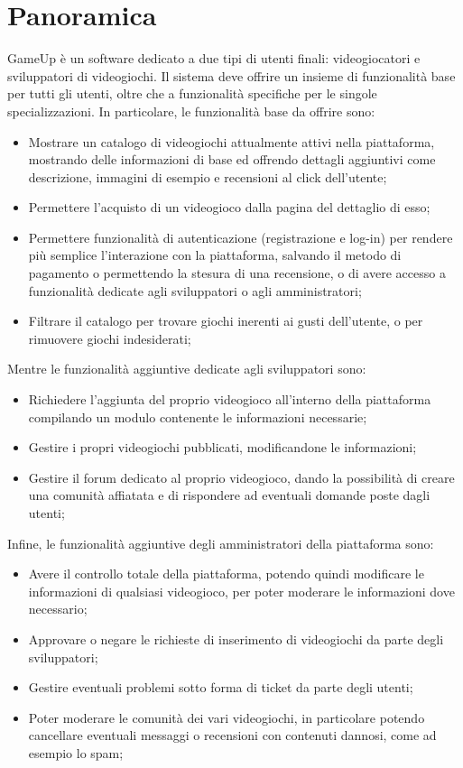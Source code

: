 \setcounter{secnumdepth}{3}
\section{Panoramica}
GameUp è un software dedicato a due tipi di utenti finali: videogiocatori e sviluppatori di videogiochi. Il sistema deve offrire un insieme di funzionalità base per tutti gli utenti, oltre che a funzionalità specifiche per le singole specializzazioni.
In particolare, le funzionalità base da offrire sono:
\begin{itemize}
\item Mostrare un catalogo di videogiochi attualmente attivi nella piattaforma, mostrando delle informazioni di base ed offrendo dettagli aggiuntivi come descrizione, immagini di esempio e recensioni al click dell’utente;
\item Permettere l’acquisto di un videogioco dalla pagina del dettaglio di esso;
\item Permettere funzionalità di autenticazione (registrazione e log-in) per rendere più semplice l’interazione con la piattaforma, salvando il metodo di pagamento o permettendo la stesura di una recensione, o di avere accesso a funzionalità dedicate agli sviluppatori o agli amministratori;
\item Filtrare il catalogo per trovare giochi inerenti ai gusti dell’utente, o per rimuovere giochi indesiderati;
\end{itemize}
Mentre le funzionalità aggiuntive dedicate agli sviluppatori sono:
\begin{itemize}
\item Richiedere l’aggiunta del proprio videogioco all’interno della piattaforma compilando un modulo contenente le informazioni necessarie;
\item Gestire i propri videogiochi pubblicati, modificandone le informazioni;
\item Gestire il forum dedicato al proprio videogioco, dando la possibilità di creare una comunità affiatata e di rispondere ad eventuali domande poste dagli utenti;
\end{itemize}
Infine, le funzionalità aggiuntive degli amministratori della piattaforma sono:
\begin{itemize}
\item Avere il controllo totale della piattaforma, potendo quindi modificare le informazioni di qualsiasi videogioco, per poter moderare le informazioni dove necessario;
\item Approvare o negare le richieste di inserimento di videogiochi da parte degli sviluppatori;
\item Gestire eventuali problemi sotto forma di ticket da parte degli utenti;
\item Poter moderare le comunità dei vari videogiochi, in particolare potendo cancellare eventuali messaggi o recensioni con contenuti dannosi, come ad esempio lo spam;
\end{itemize}

